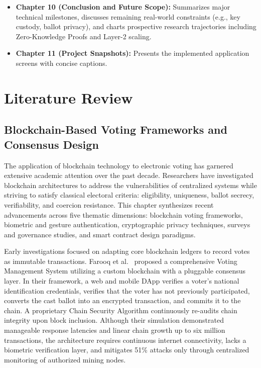 \documentclass[12pt,a4paper]{report}
\begin{document}
\begin{itemize}
    \item \textbf{Chapter 10 (Conclusion and Future Scope):} Summarizes major technical milestones, discusses remaining real-world constraints (e.g., key custody, ballot privacy), and charts prospective research trajectories including Zero-Knowledge Proofs and Layer-2 scaling.
    \item \textbf{Chapter 11 (Project Snapshots):} Presents the implemented application screens with concise captions.
\end{itemize}

\chapter{Literature Review}
\section{Blockchain-Based Voting Frameworks and Consensus Design}

The application of blockchain technology to electronic voting has garnered extensive academic attention over the past decade. Researchers have investigated blockchain architectures to address the vulnerabilities of centralized systems while striving to satisfy classical electoral criteria: eligibility, uniqueness, ballot secrecy, verifiability, and coercion resistance. This chapter synthesizes recent advancements across five thematic dimensions: blockchain voting frameworks, biometric and gesture authentication, cryptographic privacy techniques, surveys and governance studies, and smart contract design paradigms.

Early investigations focused on adapting core blockchain ledgers to record votes as immutable transactions. Farooq et al.~\cite{Farooq2022} proposed a comprehensive Voting Management System utilizing a custom blockchain with a pluggable consensus layer. In their framework, a web and mobile DApp verifies a voter's national identification credentials, verifies that the voter has not previously participated, converts the cast ballot into an encrypted transaction, and commits it to the chain. A proprietary Chain Security Algorithm continuously re-audits chain integrity upon block inclusion. Although their simulation demonstrated manageable response latencies and linear chain growth up to six million transactions, the architecture requires continuous internet connectivity, lacks a biometric verification layer, and mitigates 51\% attacks only through centralized monitoring of authorized mining nodes.
\end{document}
